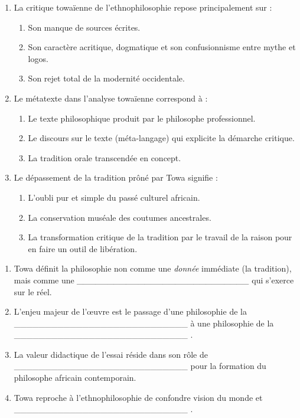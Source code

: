 \documentclass[11pt]{article}
\begin{document}
\begin{exercice}
\begin{enumerate}
    \item La critique towaïenne de l'ethnophilosophie repose principalement sur :
    \begin{enumerate}
        \item Son manque de sources écrites.
        \item Son caractère acritique, dogmatique et son confusionnisme entre mythe et logos.
        \item Son rejet total de la modernité occidentale.
    \end{enumerate}
    \item Le \og métatexte \fg{} dans l'analyse towaïenne correspond à :
    \begin{enumerate}
        \item Le texte philosophique produit par le philosophe professionnel.
        \item Le discours sur le texte (méta-langage) qui explicite la démarche critique.
        \item La tradition orale transcendée en concept.
    \end{enumerate}
    \item Le \og dépassement de la tradition \fg{} prôné par Towa signifie :
    \begin{enumerate}
        \item L'oubli pur et simple du passé culturel africain.
        \item La conservation muséale des coutumes ancestrales.
        \item La transformation critique de la tradition par le travail de la raison pour en faire un outil de libération.
    \end{enumerate}
\end{enumerate}
\end{exercice}

\begin{exercice}
\begin{enumerate}
    \item Towa définit la philosophie non comme une \textit{donnée} immédiate (la tradition), mais comme une \textit{\_\_\_\_\_\_\_\_\_\_\_\_\_\_\_\_\_\_\_\_\_\_\_\_\_\_\_\_} qui s'exerce sur le réel.
    \item L'enjeu majeur de l'œuvre est le passage d'une \og philosophie de la \_\_\_\_\_\_\_\_\_\_\_\_\_\_\_\_\_\_\_\_\_\_\_\_\_\_\_\_ \fg{} à une \og philosophie de la \_\_\_\_\_\_\_\_\_\_\_\_\_\_\_\_\_\_\_\_\_\_\_\_\_\_\_\_ \fg{}.
    \item La \og valeur didactique \fg{} de l'essai réside dans son rôle de \_\_\_\_\_\_\_\_\_\_\_\_\_\_\_\_\_\_\_\_\_\_\_\_\_\_\_\_ pour la formation du philosophe africain contemporain.
    \item Towa reproche à l'ethnophilosophie de confondre \og vision du monde \fg{} et \og \_\_\_\_\_\_\_\_\_\_\_\_\_\_\_\_\_\_\_\_\_\_\_\_\_\_\_\_ \fg{}.
\end{enumerate}
\end{exercice}
\end{document}
